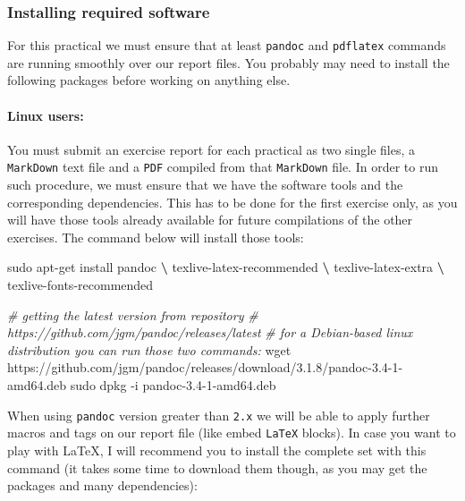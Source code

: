 \documentclass[10pt,a4paper,]{article}
\newenvironment{Shaded}{}{}
\newcommand{\CommentTok}[1]{\textcolor[rgb]{0.38,0.63,0.69}{\textit{#1}}}
\newcommand{\ExtensionTok}[1]{#1}
\newcommand{\FunctionTok}[1]{\textcolor[rgb]{0.02,0.16,0.49}{#1}}
\newcommand{\KeywordTok}[1]{\textcolor[rgb]{0.00,0.44,0.13}{\textbf{#1}}}
\newcommand{\NormalTok}[1]{#1}
\begin{document}
\hypertarget{installing-required-software}{%
\subsubsection{Installing required
software}\label{installing-required-software}}

For this practical we must ensure that at least \texttt{pandoc} and
\texttt{pdflatex} commands are running smoothly over our report files.
You probably may need to install the following packages before working
on anything else.

\hypertarget{linux-users}{%
\paragraph{\texorpdfstring{\textbf{Linux}
users:}{Linux users:}}\label{linux-users}}

You must submit an exercise report for each practical as two single
files, a \texttt{MarkDown} text file and a \texttt{PDF} compiled from
that \texttt{MarkDown} file. In order to run such procedure, we must
ensure that we have the software tools and the corresponding
dependencies. This has to be done for the first exercise only, as you
will have those tools already available for future compilations of the
other exercises. The command below will install those tools:

\begin{Shaded}
\begin{Highlighting}[]
\FunctionTok{sudo}\NormalTok{ apt{-}get install pandoc }\KeywordTok{\textbackslash{}}
                     \ExtensionTok{texlive{-}latex{-}recommended} \KeywordTok{\textbackslash{}}
                     \ExtensionTok{texlive{-}latex{-}extra} \KeywordTok{\textbackslash{}}
                     \ExtensionTok{texlive{-}fonts{-}recommended}

\CommentTok{\# getting the latest version from repository}
\CommentTok{\#     https://github.com/jgm/pandoc/releases/latest}
\CommentTok{\# for a Debian{-}based linux distribution you can run those two commands:}
\FunctionTok{wget}\NormalTok{ https://github.com/jgm/pandoc/releases/download/3.1.8/pandoc{-}3.4{-}1{-}amd64.deb}
\FunctionTok{sudo}\NormalTok{ dpkg {-}i pandoc{-}3.4{-}1{-}amd64.deb}
\end{Highlighting}
\end{Shaded}

When using \texttt{pandoc} version greater than \texttt{2.x} we will be
able to apply further macros and tags on our report file (like embed
\texttt{LaTeX} blocks). In case you want to play with \LaTeX, I will
recommend you to install the complete set with this command (it takes
some time to download them though, as you may get the packages and many
dependencies):
\end{document}

